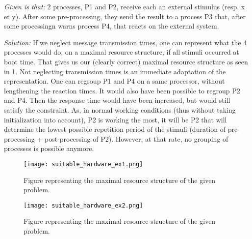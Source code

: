 \documentclass[../main.tex]{subfiles}
\begin{document}
\begin{exmp}
\emph{Given is that:} 2 processes, P1 and P2, receive each an external stimulus (resp. x et y). After some pre-processing, they send the result to a process P3 that, after some processingn warns process P4, that reacts on the external system. 

\emph{Solution:} If we neglect message transmission times, one can represent what the 4 processes would do, on a maximal resource structure, if all stimuli occurred at boot time.
That gives us our (clearly correct) maximal resource structure as seen in \ref{f:sh_ex1}.
Not neglecting transmission times is an immediate adaptation of the representation. One can regroup P1 and P4 on a same processor, without lengthening the reaction times. It would also have been possible to regroup P2 and P4. Then the response time would have been increased, but would still satisfy the constraint.
As, in normal working conditions (thus without taking initialization into account), P2 is working the most, it will be P2 that will determine the lowest possible repetition period of the stimuli (duration of pre-processing + post-processing of P2). However, at that rate, no grouping of processes is possible anymore.

\begin{figure}[H]
	\texttt{[image: suitable\_hardware\_ex1.png]}
	\caption{Figure representing the maximal resource structure of the given problem.}
	\label{f:sh_ex1}
\end{figure}

\begin{figure}[H]
	\texttt{[image: suitable\_hardware\_ex2.png]}
	\caption{Figure representing the maximal resource structure of the given problem.}
	\label{f:sh_ex2}
\end{figure}
\end{exmp}
\end{document}
